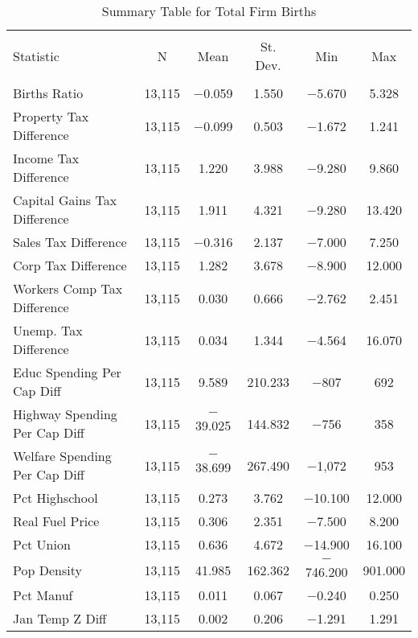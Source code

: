 
\begin{table}[!htbp] \centering 
  \caption{Summary Table for  Total Firm Births} 
  \label{--summary} 
\begin{tabular}{@{\extracolsep{5pt}}lccccc} 
\\[-1.8ex]\hline 
\hline \\[-1.8ex] 
Statistic & \multicolumn{1}{c}{N} & \multicolumn{1}{c}{Mean} & \multicolumn{1}{c}{St. Dev.} & \multicolumn{1}{c}{Min} & \multicolumn{1}{c}{Max} \\ 
\hline \\[-1.8ex] 
Births Ratio & 13,115 & $-$0.059 & 1.550 & $-$5.670 & 5.328 \\ 
Property Tax Difference & 13,115 & $-$0.099 & 0.503 & $-$1.672 & 1.241 \\ 
Income Tax Difference & 13,115 & 1.220 & 3.988 & $-$9.280 & 9.860 \\ 
Capital Gains Tax Difference & 13,115 & 1.911 & 4.321 & $-$9.280 & 13.420 \\ 
Sales Tax Difference & 13,115 & $-$0.316 & 2.137 & $-$7.000 & 7.250 \\ 
Corp Tax Difference & 13,115 & 1.282 & 3.678 & $-$8.900 & 12.000 \\ 
Workers Comp Tax Difference & 13,115 & 0.030 & 0.666 & $-$2.762 & 2.451 \\ 
Unemp. Tax Difference & 13,115 & 0.034 & 1.344 & $-$4.564 & 16.070 \\ 
Educ Spending Per Cap Diff & 13,115 & 9.589 & 210.233 & $-$807 & 692 \\ 
Highway Spending Per Cap Diff & 13,115 & $-$39.025 & 144.832 & $-$756 & 358 \\ 
Welfare Spending Per Cap Diff & 13,115 & $-$38.699 & 267.490 & $-$1,072 & 953 \\ 
Pct Highschool & 13,115 & 0.273 & 3.762 & $-$10.100 & 12.000 \\ 
Real Fuel Price & 13,115 & 0.306 & 2.351 & $-$7.500 & 8.200 \\ 
Pct Union & 13,115 & 0.636 & 4.672 & $-$14.900 & 16.100 \\ 
Pop Density & 13,115 & 41.985 & 162.362 & $-$746.200 & 901.000 \\ 
Pct Manuf & 13,115 & 0.011 & 0.067 & $-$0.240 & 0.250 \\ 
Jan Temp Z Diff & 13,115 & 0.002 & 0.206 & $-$1.291 & 1.291 \\ 

\end{tabular}
\end{table}
